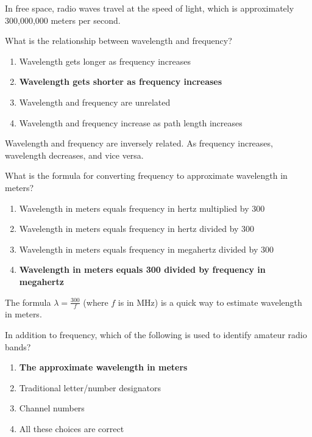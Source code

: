 In free space, radio waves travel at the speed of light, which is approximately 300,000,000 meters per second.

\begin{tcolorbox}[colback=gray!10!white,colframe=black!75!black,title={T3B05}]
What is the relationship between wavelength and frequency?
\begin{enumerate}[label=\Alph*),noitemsep]
    \item Wavelength gets longer as frequency increases
    \item \textbf{Wavelength gets shorter as frequency increases}
    \item Wavelength and frequency are unrelated
    \item Wavelength and frequency increase as path length increases
\end{enumerate}
\end{tcolorbox}

Wavelength and frequency are inversely related. As frequency increases, wavelength decreases, and vice versa.

\begin{tcolorbox}[colback=gray!10!white,colframe=black!75!black,title={T3B06}]
What is the formula for converting frequency to approximate wavelength in meters?
\begin{enumerate}[label=\Alph*),noitemsep]
    \item Wavelength in meters equals frequency in hertz multiplied by 300
    \item Wavelength in meters equals frequency in hertz divided by 300
    \item Wavelength in meters equals frequency in megahertz divided by 300
    \item \textbf{Wavelength in meters equals 300 divided by frequency in megahertz}
\end{enumerate}
\end{tcolorbox}

The formula \(\lambda = \frac{300}{f}\) (where \(f\) is in MHz) is a quick way to estimate wavelength in meters.

\begin{tcolorbox}[colback=gray!10!white,colframe=black!75!black,title={T3B07}]
In addition to frequency, which of the following is used to identify amateur radio bands?
\begin{enumerate}[label=\Alph*),noitemsep]
    \item \textbf{The approximate wavelength in meters}
    \item Traditional letter/number designators
    \item Channel numbers
    \item All these choices are correct
\end{enumerate}
\end{tcolorbox}

